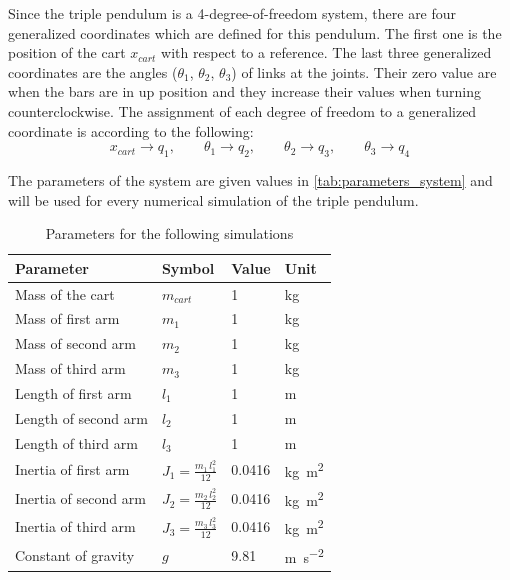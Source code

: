 \documentclass[a4paper,12pt]{article}
\begin{document}
Since the triple pendulum is a 4-degree-of-freedom system, there are four generalized coordinates which are defined for this pendulum. The first one is the position of the cart $x_{cart}$ with respect to a reference. The last three generalized coordinates are the angles ($\theta_1$, $\theta_2$, $\theta_3$) of links at the joints. Their zero value are when the bars are in up position and they increase their values when turning counterclockwise. The assignment of each degree of freedom to a generalized coordinate is according to the following:
\[
	x_{cart}\to q_1, \qquad \theta_1\to q_2, \qquad \theta_2\to q_3, \qquad \theta_3\to q_4
\]

The parameters of the system are given values in \autoref{tab:parameters_system} and will be used for every numerical simulation of the triple pendulum.
\begin{table}[H]
	\centering
	\caption{Parameters for the following simulations}
	\label{tab:parameters_system}
	\begin{tabular}{@{}llll@{}}
		\toprule
		Parameter             & Symbol                      & Value  & Unit                         \\ \midrule
		Mass of the cart      & $m_{cart}$                  & 1      & kg                           \\
		Mass of first arm     & $m_1$                       & 1      & kg                           \\
		Mass of second arm    & $m_2$                       & 1      & kg                           \\
		Mass of third arm     & $m_3$                       & 1      & kg                           \\
		Length of first arm   & $l_1$                       & 1      & m                            \\
		Length of second arm  & $l_2$                       & 1      & m                            \\
		Length of third arm   & $l_3$                       & 1      & m                            \\
		Inertia of first arm  & $J_1=\frac{m_1\,l_1^2}{12}$ & 0.0416 & \si{\kilo\gram\square\metre} \\
		Inertia of second arm & $J_2=\frac{m_2\,l_2^2}{12}$ & 0.0416 & \si{\kilo\gram\square\metre} \\
		Inertia of third arm  & $J_3=\frac{m_3\,l_3^2}{12}$ & 0.0416 & \si{\kilo\gram\square\metre} \\
		Constant of gravity   & $g$                         & 9.81   & \si{m\per\square\second}     \\ \bottomrule
	\end{tabular}
\end{table}
\end{document}
